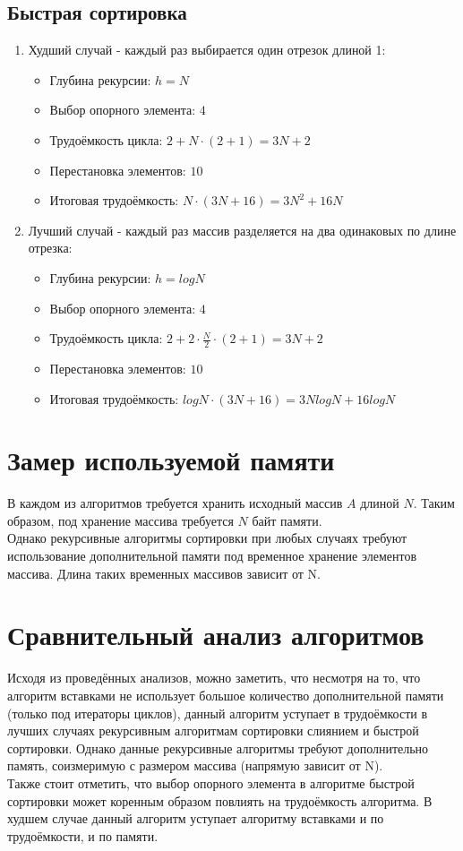\documentclass[12pt, a4paper]{report}
\begin{document}
	\subsection{Быстрая сортировка}
		\begin{enumerate}
		\item Худший случай - каждый раз выбирается один отрезок длиной 1:
		\begin{itemize}
			\item Глубина рекурсии: $h = N$
			\item Выбор опорного элемента: $4$
			\item Трудоёмкость цикла: $2 + N\cdot(2 + 1)=3N + 2$
			\item Перестановка элементов: $10$\\
			\item Итоговая трудоёмкость: $N\cdot(3N + 16) = 3N^2 + 16N$
		\end{itemize}
		\item Лучший случай - каждый раз массив разделяется на два одинаковых по длине отрезка:
		\begin{itemize}
			\item Глубина рекурсии: $h = logN$
			\item Выбор опорного элемента: $4$
			\item Трудоёмкость цикла: $2 + 2\cdot\frac{N}{2}\cdot(2 + 1)=3N + 2$
			\item Перестановка элементов: $10$\\
			\item Итоговая трудоёмкость: $logN\cdot(3N + 16) = 3NlogN + 16logN$
		\end{itemize}
	\end{enumerate}

	\section{Замер используемой памяти}
	В каждом из алгоритмов требуется хранить исходный массив $A$ длиной $N$. Таким образом, под хранение массива требуется $N$ байт памяти.\\
	Однако рекурсивные алгоритмы сортировки при любых случаях требуют использование дополнительной памяти под временное хранение элементов массива. Длина таких временных массивов зависит от N.
	
	\section{Сравнительный анализ алгоритмов}
	Исходя из проведённых анализов, можно заметить, что несмотря на то, что алгоритм вставками не использует большое количество дополнительной памяти (только под итераторы циклов), данный алгоритм уступает в трудоёмкости в лучших случаях рекурсивным алгоритмам сортировки слиянием и быстрой сортировки. Однако данные рекурсивные алгоритмы требуют дополнительно память, соизмеримую с размером массива (напрямую зависит от N).\\
	Также стоит отметить, что выбор опорного элемента в алгоритме быстрой сортировки может коренным образом повлиять на трудоёмкость алгоритма. В худшем случае данный алгоритм уступает алгоритму вставками и по трудоёмкости, и по памяти.
	
\end{document}
